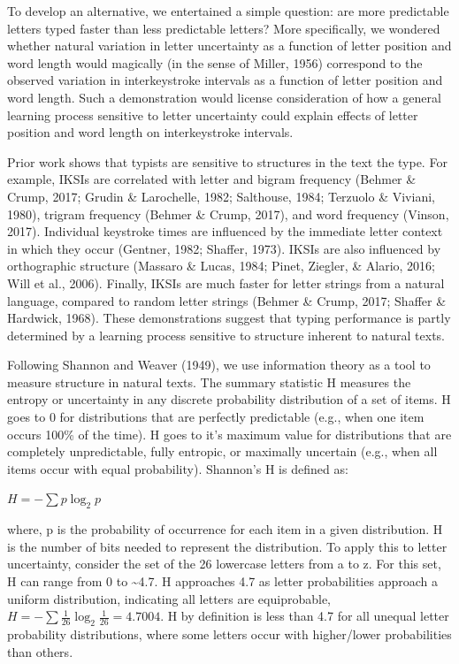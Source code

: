 \documentclass[floatsintext,man]{apa6}
\theoremstyle{definition}
\theoremstyle{definition}
\theoremstyle{definition}
\theoremstyle{remark}
\begin{document}
To develop an alternative, we entertained a simple question: are more
predictable letters typed faster than less predictable letters? More
specifically, we wondered whether natural variation in letter
uncertainty as a function of letter position and word length would
magically (in the sense of Miller, 1956) correspond to the observed
variation in interkeystroke intervals as a function of letter position
and word length. Such a demonstration would license consideration of how
a general learning process sensitive to letter uncertainty could explain
effects of letter position and word length on interkeystroke intervals.

Prior work shows that typists are sensitive to structures in the text
the type. For example, IKSIs are correlated with letter and bigram
frequency (Behmer \& Crump, 2017; Grudin \& Larochelle, 1982; Salthouse,
1984; Terzuolo \& Viviani, 1980), trigram frequency (Behmer \& Crump,
2017), and word frequency (Vinson, 2017). Individual keystroke times are
influenced by the immediate letter context in which they occur (Gentner,
1982; Shaffer, 1973). IKSIs are also influenced by orthographic
structure (Massaro \& Lucas, 1984; Pinet, Ziegler, \& Alario, 2016; Will
et al., 2006). Finally, IKSIs are much faster for letter strings from a
natural language, compared to random letter strings (Behmer \& Crump,
2017; Shaffer \& Hardwick, 1968). These demonstrations suggest that
typing performance is partly determined by a learning process sensitive
to structure inherent to natural texts.

Following Shannon and Weaver (1949), we use information theory as a tool
to measure structure in natural texts. The summary statistic H measures
the entropy or uncertainty in any discrete probability distribution of a
set of items. H goes to 0 for distributions that are perfectly
predictable (e.g., when one item occurs 100\% of the time). H goes to
it's maximum value for distributions that are completely unpredictable,
fully entropic, or maximally uncertain (e.g., when all items occur with
equal probability). Shannon's H is defined as:

\(H = -\sum p \log_2 p\)

where, p is the probability of occurrence for each item in a given
distribution. H is the number of bits needed to represent the
distribution. To apply this to letter uncertainty, consider the set of
the 26 lowercase letters from a to z. For this set, H can range from 0
to \textasciitilde{}4.7. H approaches 4.7 as letter probabilities
approach a uniform distribution, indicating all letters are
equiprobable, \(H = -\sum \frac{1}{26} \log_2 \frac{1}{26} = 4.7004\). H
by definition is less than 4.7 for all unequal letter probability
distributions, where some letters occur with higher/lower probabilities
than others.
\end{document}
